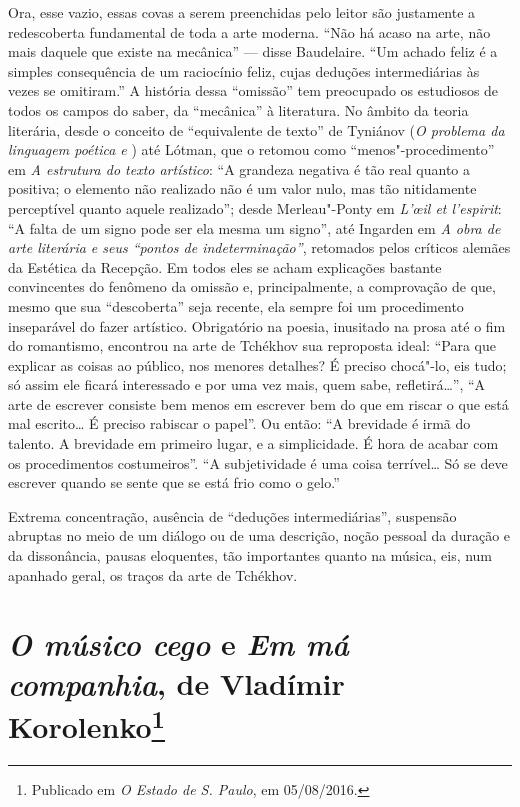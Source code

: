 Ora, esse vazio, essas covas a serem preenchidas pelo leitor são
justamente a redescoberta fundamental de toda a arte moderna.
``Não há acaso na arte, não mais daquele que existe na mecânica''
--- disse Baudelaire. ``Um achado feliz é a simples consequência
de um raciocínio feliz, cujas deduções intermediárias às vezes se
omitiram.'' A história dessa ``omissão'' tem preocupado os estudiosos
de todos os campos do saber, da ``mecânica'' à literatura. No âmbito
da teoria literária, desde o conceito de ``equivalente de texto''
de Tyniánov (\emph{O problema da linguagem poética  e })
até Lótman, que o retomou como ``menos"-procedimento'' em \emph{A estrutura
do texto artístico}: ``A grandeza negativa é tão real quanto a positiva; o
elemento não realizado não é um valor nulo, mas tão nitidamente perceptível
quanto aquele realizado''; desde Merleau"-Ponty em \emph{L'œil et
l'espirit}: ``A falta de um signo pode ser ela mesma um signo'',
até Ingarden em \emph{A obra de arte literária e seus ``pontos de
indeterminação''}, retomados pelos críticos alemães da Estética da
Recepção. Em todos eles se acham explicações bastante convincentes
do fenômeno da omissão e, principalmente, a comprovação de que,
mesmo que sua ``descoberta'' seja recente, ela sempre foi um
procedimento inseparável do fazer artístico. Obrigatório na
poesia, inusitado na prosa até o fim do romantismo, encontrou na
arte de Tchékhov sua reproposta ideal: ``Para que explicar as
coisas ao público, nos menores detalhes? É preciso chocá"-lo, eis
tudo; só assim ele ficará interessado e por uma vez mais, quem
sabe, refletirá\ldots{}'', ``A arte de escrever consiste bem menos
em escrever bem do que em riscar o que está mal escrito\ldots{} É
preciso rabiscar o papel''. Ou então: ``A brevidade é irmã do
talento. A brevidade em primeiro lugar, e a simplicidade. É hora
de acabar com os procedimentos costumeiros''. ``A subjetividade é
uma coisa terrível\ldots{} Só se deve escrever quando se sente que
se está frio como o gelo.''

Extrema concentração, ausência de ``deduções intermediárias'',
suspensão abruptas no meio de um diálogo ou de uma descrição,
noção pessoal da duração e da dissonância, pausas eloquentes,
tão importantes quanto na música, eis, num apanhado geral, os
traços da arte de Tchékhov.

\chapter{\emph{O músico cego} e \emph{Em má companhia}, de
Vladímir Korolenko\footnote{Publicado em \emph{O Estado de S.
Paulo}, em 05/08/2016.}}
\label{korolenko}

